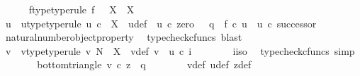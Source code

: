 \begin{isabellebody}
\ \ \ \ \isamarkupfalse%
\ f{\isacharunderscore}{\kern0pt}type{\isacharbrackleft}{\kern0pt}type{\isacharunderscore}{\kern0pt}rule{\isacharbrackright}{\kern0pt}{\isacharcolon}{\kern0pt}\ {\isachardoublequoteopen}f{\isacharcolon}{\kern0pt}\ \ \ X\ {\isasymrightarrow}\ X{\isachardoublequoteclose}\isanewline
\isanewline
\ \ \ \ \isamarkupfalse%
\ u\ \ u{\isacharunderscore}{\kern0pt}type{\isacharbrackleft}{\kern0pt}type{\isacharunderscore}{\kern0pt}rule{\isacharbrackright}{\kern0pt}{\isacharcolon}{\kern0pt}\ {\isachardoublequoteopen}u{\isacharcolon}{\kern0pt}\ {\isasymnat}\isactrlsub c\ {\isasymrightarrow}\ X{\isachardoublequoteclose}\ \ u{\isacharunderscore}{\kern0pt}def{\isacharcolon}{\kern0pt}\ \ {\isachardoublequoteopen}u\ {\isasymcirc}\isactrlsub c\ zero\ {\isacharequal}{\kern0pt}\ \ q\ {\isasymand}\ f\ {\isasymcirc}\isactrlsub c\ u\ {\isacharequal}{\kern0pt}\ u\ {\isasymcirc}\isactrlsub c\ successor{\isachardoublequoteclose}\isanewline
\ \ \ \ \ \ \isamarkupfalse%
\ natural{\isacharunderscore}{\kern0pt}number{\isacharunderscore}{\kern0pt}object{\isacharunderscore}{\kern0pt}property{}\ \isamarkupfalse%
\ {\isacharparenleft}{\kern0pt}typecheck{\isacharunderscore}{\kern0pt}cfuncs{\isacharcomma}{\kern0pt}\ blast{\isacharparenright}{\kern0pt}\isanewline
\ \ \ \ \isamarkupfalse%
\ v\ \ v{\isacharunderscore}{\kern0pt}type{\isacharbrackleft}{\kern0pt}type{\isacharunderscore}{\kern0pt}rule{\isacharbrackright}{\kern0pt}{\isacharcolon}{\kern0pt}\ {\isachardoublequoteopen}v{\isacharcolon}{\kern0pt}\ N\ {\isasymrightarrow}\ X{\isachardoublequoteclose}\ \ v{\isacharunderscore}{\kern0pt}def{\isacharcolon}{\kern0pt}\ {\isachardoublequoteopen}v\ {\isacharequal}{\kern0pt}\ u\ {\isasymcirc}\isactrlsub c\ i\isactrlbold {\isasyminverse}{\isachardoublequoteclose}\isanewline
\ \ \ \ \ \ \isamarkupfalse%
\ i{\isacharunderscore}{\kern0pt}iso\ \isamarkupfalse%
\ {\isacharparenleft}{\kern0pt}typecheck{\isacharunderscore}{\kern0pt}cfuncs{\isacharcomma}{\kern0pt}\ simp{\isacharparenright}{\kern0pt}\isanewline
\ \ \ \ \isamarkupfalse%
\ \isamarkupfalse%
\ bottom{\isacharunderscore}{\kern0pt}triangle{\isacharcolon}{\kern0pt}\ {\isachardoublequoteopen}v\ {\isasymcirc}\isactrlsub c\ z\ {\isacharequal}{\kern0pt}\ q{\isachardoublequoteclose}\isanewline
\ \ \ \ \ \ \isamarkupfalse%
\ v{\isacharunderscore}{\kern0pt}def\ u{\isacharunderscore}{\kern0pt}def\ z{\isacharunderscore}{\kern0pt}def\ \isamarkupfalse%

\end{isabellebody}
